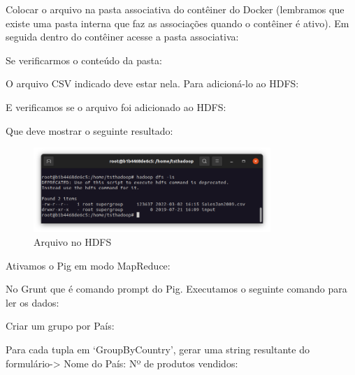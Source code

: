 \documentclass[a4paper,11pt]{article}
\begin{document}
Colocar o arquivo na pasta associativa do contêiner do Docker (lembramos que existe uma pasta interna que faz as associações quando o contêiner é ativo). Em seguida dentro do contêiner acesse a pasta associativa: \\

Se verificarmos o conteúdo da pasta: \\

O arquivo CSV indicado deve estar nela. Para adicioná-lo ao HDFS: \\

E verificamos se o arquivo foi adicionado ao HDFS: \\

Que deve mostrar o seguinte resultado:
\begin{figure}[H]
	\centering
	\includegraphics[width=0.8\textwidth]{imagem/listagem}
	\caption{Arquivo no HDFS}
\end{figure}

Ativamos o Pig em modo MapReduce: \\

No Grunt que é comando prompt do Pig. Executamos o seguinte comando para ler os dados: \\

Criar um grupo por País: \\

Para cada tupla em ‘GroupByCountry’, gerar uma string resultante do formulário-> Nome do País: Nº de produtos vendidos: \\
\end{document}
